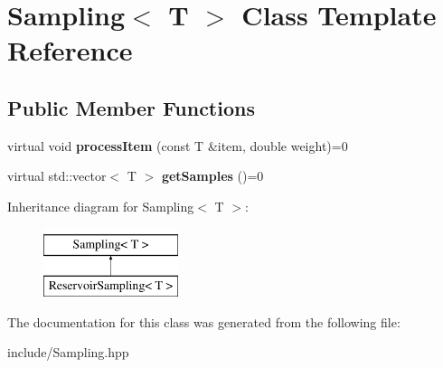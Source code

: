 \hypertarget{classSampling}{}\section{Sampling$<$ T $>$ Class Template Reference}
\label{classSampling}
\subsection*{Public Member Functions}
\begin{DoxyCompactItemize}
\item 
virtual void {\bfseries process\+Item} (const T \&item, double weight)=0\hypertarget{classSampling_a8fa11a1c8d5ed97aac1d98b02ebe322f}{}\label{classSampling_a8fa11a1c8d5ed97aac1d98b02ebe322f}

\item 
virtual std\+::vector$<$ T $>$ {\bfseries get\+Samples} ()=0\hypertarget{classSampling_ae24b25446185184b71f40e7dda5560f7}{}\label{classSampling_ae24b25446185184b71f40e7dda5560f7}

\end{DoxyCompactItemize}
Inheritance diagram for Sampling$<$ T $>$\+:\begin{figure}[H]
\begin{center}
\leavevmode
\includegraphics[height=2.000000cm]{classSampling}
\end{center}
\end{figure}


The documentation for this class was generated from the following file\+:\begin{DoxyCompactItemize}
\item 
include/Sampling.\+hpp\end{DoxyCompactItemize}
